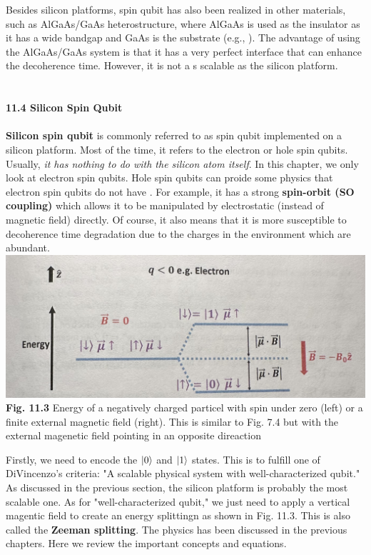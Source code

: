 \documentclass{article}
\begin{document}
Besides silicon platforms, spin qubit has also been realized in other materials, such as AlGaAs/GaAs heterostructure, 
where AlGaAs is used as the insulator as it has a wide bandgap and GaAs is the substrate (e.g., \cite{5koppens2006driven}).
The advantage of using the AlGaAs/GaAs system is that it has a very perfect interface that can enhance the decoherence time.
However, it is not a s scalable as the silicon platform.\\\\\\
\textbf{\large 11.4 Silicon Spin Qubit}\\\\
\textbf{Silicon spin qubit} is commonly referred to as spin qubit implemented on a silicon platform.
Most of the time, it refers to the electron or hole spin qubits. Usually, \textit{it has nothing to do
with the silicon atom itself}. In this chapter, we only look at electron spin qubits. Hole spin qubits can proide some
physics that electron spin qubits do not have \cite{6fang2023recent}. For example, it has a strong \textbf{spin-orbit (SO coupling)} which allows
it to be manipulated by electrostatic (instead of magnetic field) directly. Of course, it also means
that it is more susceptible to decoherence time degradation due to the charges in the environment which are abundant.\\

\includegraphics[scale=0.45]{Fig.11.3.jpeg}\\
\textbf{Fig. 11.3} Energy of a negatively charged particel with spin under zero (left) or a finite external
magnetic field (right). This is similar to Fig. 7.4 but with the external magenetic field pointing in an opposite direaction

Firstly, we need to encode the $\ket{0}$ and $\ket{1}$ states. This is to fulfill one of 
DiVincenzo's criteria: "A scalable physical system with well-characterized qubit." As discussed 
in the previous section, the silicon platform is probably the most scalable one.
As for "well-characterized qubit," we just need to apply a vertical magentic field
to create an energy splittingn as shown in Fig. 11.3. This is also called the \textbf{Zeeman splitting}.
The physics has been discussed in the previous chapters. Here we review the important concepts and equations.
\end{document}
